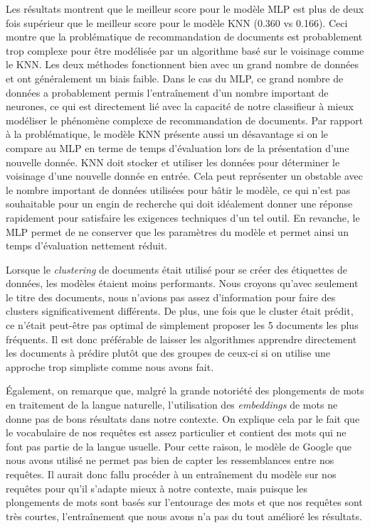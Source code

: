 Les résultats montrent que le meilleur score pour le modèle MLP est plus de deux fois supérieur que le meilleur score pour le modèle KNN (0.360 vs 0.166). 
Ceci montre que la problématique de recommandation de documents est probablement trop complexe pour être modélisée par un algorithme basé sur le voisinage comme le KNN. 
Les deux méthodes fonctionnent bien avec un grand nombre de données et ont généralement un biais faible. 
Dans le cas du MLP, ce grand nombre de données a probablement permis l'entraînement d'un nombre important de neurones, ce qui est directement lié avec la capacité de notre classifieur à mieux modéliser le phénomène complexe de recommandation de documents. 
Par rapport à la problématique, le modèle KNN présente aussi un désavantage si on le compare au MLP en terme de temps d'évaluation lors de la présentation d'une nouvelle donnée. KNN doit stocker et utiliser les données pour déterminer le voisinage d'une nouvelle donnée en entrée. 
Cela peut représenter un obstable avec le nombre important de données utilisées pour bâtir le modèle, ce qui n'est pas souhaitable pour un engin de recherche qui doit idéalement donner une réponse rapidement pour satisfaire les exigences techniques d'un tel outil. 
En revanche, le MLP permet de ne conserver que les paramètres du modèle et permet ainsi un temps d'évaluation nettement réduit.
\break

Lorsque le \textit{clustering} de documents était utilisé pour se créer des étiquettes de données, les modèles étaient moins performants. 
Nous croyons qu'avec seulement le titre des documents, nous n'avions pas assez d'information pour faire des clusters significativement différents. 
De plus, une fois que le cluster était prédit, ce n'était peut-être pas optimal de simplement proposer les 5 documents les plus fréquents. 
Il est donc préférable de laisser les algorithmes apprendre directement les documents à prédire plutôt que des groupes de ceux-ci si on utilise une approche trop simpliste comme nous avons fait.
\break

Également, on remarque que, malgré la grande notoriété des plongements de mots en traitement de la langue naturelle, l'utilisation des \emph{embeddings} de mots ne donne pas de bons résultats dans notre contexte.
On explique cela par le fait que le vocabulaire de nos requêtes est assez particulier et contient des mots qui ne font pas partie de la langue usuelle.
Pour cette raison, le modèle de Google que nous avons utilisé ne permet pas bien de capter les ressemblances entre nos requêtes. 
Il aurait donc fallu procéder à un entraînement du modèle sur nos requêtes pour qu'il s'adapte mieux à notre contexte, mais puisque les plongements de mots sont basés sur l'entourage des mots et que nos requêtes sont très courtes, l'entraînement que nous avons n'a pas du tout amélioré les résultats.

